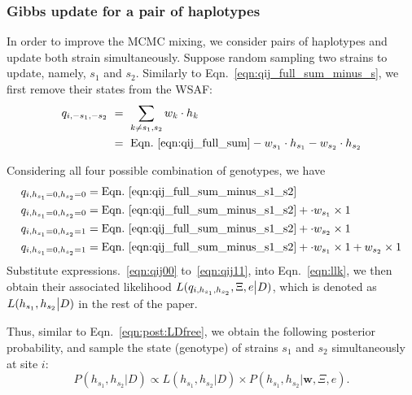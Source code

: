 \documentclass{bioinfo}
\begin{document}
\subsubsection{Gibbs update for a pair of haplotypes}\label{sec:deconvolute}
In order to improve the MCMC mixing, we consider pairs of haplotypes and update both strain simultaneously. Suppose random sampling two strains to update, namely, $s_1$ and $s_2$. Similarly to Eqn.~\eqref{eqn:qij_full_sum_minus_s}, we first remove their states from the WSAF:
\begin{equation}
\begin{split}
q_{i,-s_1, -s_2} & ~ = ~ \sum_{k\neq s_1,s_2} w_k \cdot h_k \\
                 & ~ = ~ \textrm{Eqn.~\eqref{eqn:qij_full_sum}} - w_{s_1} \cdot h_{s_1} - w_{s_2} \cdot h_{s_2} \label{eqn:qij_full_sum_minus_s1_s2}
\end{split}
\end{equation}

Considering all four possible combination of genotypes, we have
\begin{align}
q_{i,h_{s_1}=0,h_{s_2}=0} & = \textrm{Eqn.~\eqref{eqn:qij_full_sum_minus_s1_s2}} \label{eqn:qij00}\\
q_{i,h_{s_1}=0,h_{s_2}=0} & = \textrm{Eqn.~\eqref{eqn:qij_full_sum_minus_s1_s2}} + \cdot w_{s_1} \times 1 \label{eqn:qij10}\\
q_{i,h_{s_1}=0,h_{s_2}=1} & = \textrm{Eqn.~\eqref{eqn:qij_full_sum_minus_s1_s2}} + \cdot w_{s_2} \times 1 \label{eqn:qij01}\\
q_{i,h_{s_1}=0,h_{s_2}=1} & = \textrm{Eqn.~\eqref{eqn:qij_full_sum_minus_s1_s2}} + \cdot w_{s_1} \times 1 + w_{s_2} \times 1 \label{eqn:qij11}
\end{align}
Substitute expressions.~\eqref{eqn:qij00} to~\eqref{eqn:qij11}, into Eqn.~\eqref{eqn:llk}, we then obtain their associated likelihood $L(q_{i,h_{s_1},h_{s_2}} , \Xi, e \big{|} D)$, which is denoted as $L(h_{s_1},h_{s_2} \big{|} D)$ in the rest of the paper.

Thus, similar to Eqn.~\eqref{eqn:post:LDfree}, we obtain the following posterior probability, and sample the state (genotype) of strains $s_1$ and $s_2$ simultaneously at site $i$:
\begin{equation}
P(h_{s_1},h_{s_2} | D) \propto L(h_{s_1},h_{s_2} |D) \times P(h_{s_1},h_{s_2} | \mathbf{w}, \Xi, e).\label{eqn:post.two:LD}
\end{equation}
\end{document}
